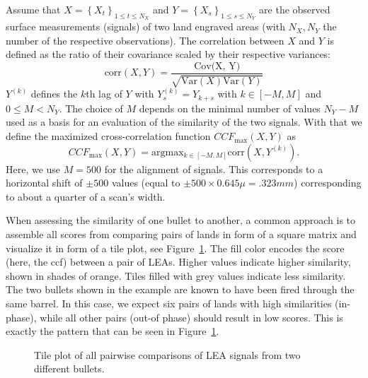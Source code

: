 \documentclass[
  12pt]{article}
\begin{document}
Assume that \(X = \left\{X_t\right\}_{1 \le t \le N_X}\) and
\(Y = \left\{X_s\right\}_{1 \le s \le N_Y}\) are the observed surface
measurements (signals) of two land engraved areas (with \(N_X, N_Y\) the
number of the respective observations). The correlation between \(X\)
and \(Y\) is defined as the ratio of their covariance scaled by their
respective variances: \[
\text{corr} (X, Y) = \frac{\text{Cov(X, Y)}}{\sqrt{\text{Var}(X) \text{Var}(Y)}}
\] \(Y^{(k)}\) defines the \(k\)th lag of \(Y\) with
\(Y^{(k)}_s = Y_{k+s}\) with \(k \in [-M, M]\) and \(0 \le M < N_Y\).
The choice of \(M\) depends on the minimal number of values \(N_Y-M\)
used as a basis for an evaluation of the similarity of the two signals.
With that we define the maximized cross-correlation function
\(CCF_{\text{max}} (X, Y)\) as \[
CCF_{\text{max}} (X, Y) = \text{arg} \text{max}_{k \in [-M, M]} \text{corr}(X, Y^{(k)}).
\] Here, we use \(M=500\) for the alignment of signals. This corresponds
to a horizontal shift of \(\pm 500\) values (equal to
\(\pm 500 \times 0.645 \mu = .323 mm\)) corresponding to about a quarter
of a scan's width.

When assessing the similarity of one bullet to another, a common
approach is to assemble all scores from comparing pairs of lands in form
of a square matrix and visualize it in form of a tile plot, see
Figure~\ref{fig-land-matrix}. The fill color encodes the score (here,
the ccf) between a pair of LEAs. Higher values indicate higher
similarity, shown in shades of orange. Tiles filled with grey values
indicate less similarity. The two bullets shown in the example are known
to have been fired through the same barrel. In this case, we expect six
pairs of lands with high similarities (in-phase), while all other pairs
(out-of phase) should result in low scores. This is exactly the pattern
that can be seen in Figure~\ref{fig-land-matrix}.

\begin{figure}


\caption{\label{fig-land-matrix}Tile plot of all pairwise comparisons of
LEA signals from two different bullets.}

\end{figure}%
\end{document}
